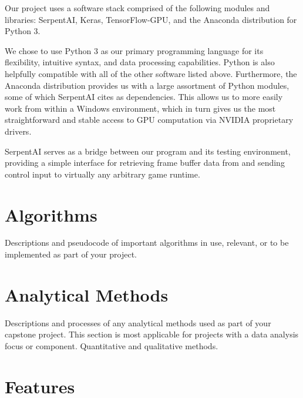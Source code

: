 Our project uses a software stack comprised of the following modules and libraries: SerpentAI, Keras, TensorFlow-GPU, and the Anaconda distribution for Python 3.

We chose to use Python 3 as our primary programming language for its flexibility, intuitive syntax, and data processing capabilities. Python is also helpfully compatible with all of the other software listed above. Furthermore, the Anaconda distribution provides us with a large assortment of Python modules, some of which SerpentAI cites as dependencies. This allows us to more easily work from within a Windows environment, which in turn gives us the most straightforward and stable access to GPU computation via NVIDIA proprietary drivers.

SerpentAI serves as a bridge between our program and its testing environment, providing a simple interface for retrieving frame buffer data from and sending control input to virtually any arbitrary game runtime. 




\section{Algorithms}

Descriptions and pseudocode of important algorithms in use, relevant, or to be implemented as part of your project.




\section{Analytical Methods}

Descriptions and processes of any analytical methods used as part of your capstone project. This section is most applicable for projects with a data analysis focus or component. Quantitative and qualitative methods.




\section{Features}

